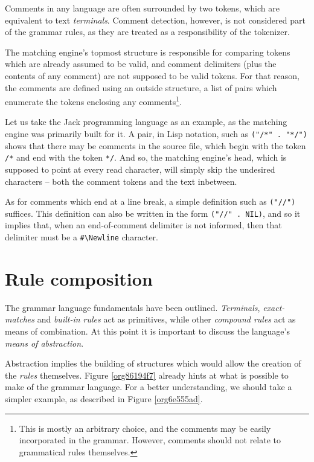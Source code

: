 \documentclass[a4paper,11pt,oneside]{article}
\begin{document}
Comments in any language are often surrounded by two tokens, which are
equivalent to text \emph{terminals}. Comment detection, however, is not
considered part of the grammar rules, as they are treated as a
responsibility of the tokenizer.

The matching engine's topmost structure is responsible for comparing
tokens which are already assumed to be valid, and comment delimiters
(plus the contents of any comment) are not supposed to be valid
tokens. For that reason, the comments are defined using an outside
structure, a list of pairs which enumerate the tokens enclosing any
comments\footnote{This is mostly an arbitrary choice, and the comments may be
easily incorporated in the grammar. However, comments should not
relate to grammatical rules themselves.}.

Let us take the Jack programming language as an example, as the
matching engine was primarily built for it. A pair, in Lisp notation,
such as \texttt{("/*" . "*/")} shows that there may be comments in the source
file, which begin with the token \texttt{/*} and end with the token \texttt{*/}. And
so, the matching engine's head, which is supposed to point at every
read character, will simply skip the undesired characters -- both the
comment tokens and the text inbetween.

As for comments which end at a line break, a simple definition such as
\texttt{("//")} suffices. This definition can also be written in the form
\texttt{("//" . NIL)}, and so it implies that, when an end-of-comment delimiter
is not informed, then that delimiter must be a \texttt{\#\textbackslash{}Newline} character.

\section{Rule composition}
\label{sec:org999b74f}

The grammar language fundamentals have been outlined. \emph{Terminals},
\emph{exact-matches} and \emph{built-in rules} act as primitives, while other
\emph{compound rules} act as means of combination. At this point it is
important to discuss the language's \emph{means of abstraction}.

Abstraction implies the building of structures which would allow the
creation of the \emph{rules} themselves. Figure \ref{org86194f7} already hints
at what is possible to make of the grammar language. For a better
understanding, we should take a simpler example, as described in
Figure \ref{org6e555ad}.
\end{document}
